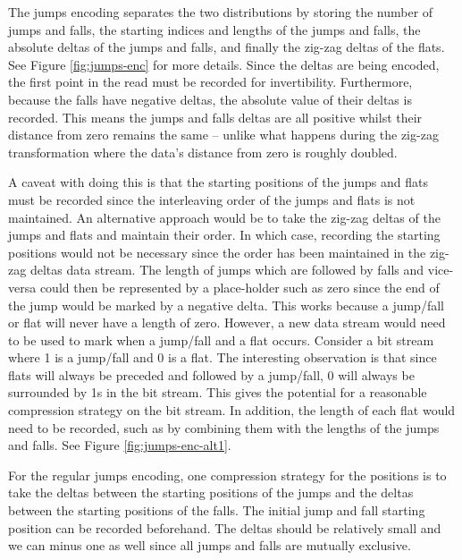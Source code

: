 


The jumps encoding separates the two distributions by storing the number of
jumps and falls, the starting indices and lengths of the jumps and falls, the
absolute deltas of the jumps and falls, and finally the zig-zag deltas of the
flats. See Figure \ref{fig:jumps-enc} for more details. Since the deltas are
being encoded, the first point in the read must be recorded for invertibility.
Furthermore, because the falls have negative deltas, the absolute value of their
deltas is recorded. This means the jumps and falls deltas are all positive
whilst their distance from zero remains the same -- unlike what happens during
the zig-zag transformation where the data's distance from zero is roughly
doubled.



A caveat with doing this is that the starting positions of the jumps and flats
must be recorded since the interleaving order of the jumps and flats is not
maintained. An alternative approach would be to take the zig-zag deltas of the
jumps and flats and maintain their order. In which case, recording the starting
positions would not be necessary since the order has been maintained in the
zig-zag deltas data stream. The length of jumps which are followed by falls and
vice-versa could then be represented by a place-holder such as zero since the
end of the jump would be marked by a negative delta. This works because a
jump/fall or flat will never have a length of zero. However, a new data stream
would need to be used to mark when a jump/fall and a flat occurs. Consider a bit
stream where 1 is a jump/fall and 0 is a flat. The interesting observation is
that since flats will always be preceded and followed by a jump/fall, 0 will
always be surrounded by 1s in the bit stream. This gives the potential for
a reasonable compression strategy on the bit stream. In addition, the length of each
flat would need to be recorded, such as by combining them with the lengths of
the jumps and falls. See Figure \ref{fig:jumps-enc-alt1}.



For the regular jumps encoding, one compression strategy for the positions is to
take the deltas between the starting positions of the jumps and the deltas
between the starting positions of the falls. The initial jump and fall starting
position can be recorded beforehand. The deltas should be relatively small and
we can minus one as well since all jumps and falls are mutually exclusive.

